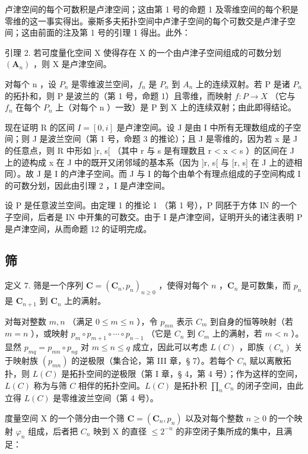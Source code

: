 卢津空间的每个可数积是卢津空间；这由第 1 号的命题 1 及零维空间的每个积是零维的这一事实得出。豪斯多夫拓扑空间中卢津子空间的每个可数交是卢津子空间；这由前面的注及第 1 号的引理 1 得出。此外：

引理 2. 若可度量化空间 X 使得存在 X 的一个由卢津子空间组成的可数分划 \((\mathbf{A}_{n})\) ，则 X 是卢津空间。

对每个 n ，设 \(P_{n}\) 是零维波兰空间，\(f_{n}\) 是 \(P_{n}\) 到 \(A_{n}\) 上的连续双射。若 P 是诸 \(P_{n}\) 的拓扑和，则 P 是波兰的（第 1 号，命题 1）且零维，而映射 \(f: P \to X\) （它与 \(f_{n}\) 在每个 \(P_{n}\) 上（对每个 n ）一致）是 P 到 X 上的连续双射；由此即得结论。

现在证明 R 的区间 \(I = [0, i]\) 是卢津空间。设 J 是由 I 中所有无理数组成的子空间；则 J 是波兰空间（第 1 号，命题 3 的推论）；且 J 是零维的，因为若 x 是 J 的任意点，则 R 中形如 {]}r, s{[} （其中 r 与 s 是有理数且 r \textless{} x \textless{} s ）的区间在 J 上的迹构成 x 在 J 中的既开又闭邻域的基本系（因为 {]}r, s{[} 与 {[}r, s{]} 在 J 上的迹相同）。故 J 是 I 的卢津子空间。而 J 与 I 的每个由单个有理点组成的子空间构成 I 的可数分划，因此由引理 2 ，I 是卢津空间。

设 P 是任意波兰空间。由定理 1 的推论 1 （第 1 号），P 同胚于方体 IN 的一个子空间，后者是 IN 中开集的可数交。由于 I 是卢津空间，证明开头的诸注表明 P 是卢津空间，从而命题 12 的证明完成。

\subsection{筛}

定义 7. 筛是一个序列 \(\mathbf{C} = (\mathbf{C}_n, p_n)_{n \geqslant 0}\) ，使得对每个 \(n\) ，\(\mathbf{C}_n\) 是可数集，而 \(p_n\) 是 \(\mathbf{C}_{n+1}\) 到 \(\mathbf{C}_n\) 上的满射。

对每对整数 \(m, n\) （满足 \(0 \leqslant m \leqslant n\) ），令 \(p_{mn}\) 表示 \(C_m\) 到自身的恒等映射（若 \(m = n\) ），或映射 \(p_m \circ p_{m+1} \circ \cdots \circ p_{n-1}\) （它是 \(C_n\) 到 \(C_m\) 上的满射，若 \(m < n\) ）。显然 \(p_{mq} = p_{mn} \circ p_{ng}\) 对 \(m \leqslant n \leqslant q\) 成立，因此可以考虑 \(L(C)\) ，即族 \((C_n)\) 关于映射族 \((p_{mn})\) 的逆极限（集合论，第 III 章，§ 7）。若每个 \(C_n\) 赋以离散拓扑，则 \(L(C)\) 是拓扑空间的逆极限（第 I 章，§ 4，第 4 号）；作为这样的空间，\(L(C)\) 称为与筛 \(C\) 相伴的拓扑空间。\(L(C)\) 是拓扑积 \(\prod_n C_n\) 的闭子空间，由此立得 \(L(C)\) 是零维波兰空间（第 4 号）。

度量空间 X 的一个筛分由一个筛 \(\mathbf{C} = (\mathbf{C}_{n}, p_{n})\) 以及对每个整数 \(n \geqslant 0\) 的一个映射 \(\varphi_{n}\) 组成，后者把 \(C_{n}\) 映到 X 的直径 \(\leqslant 2^{-n}\) 的非空闭子集所成的集中，且满足：

